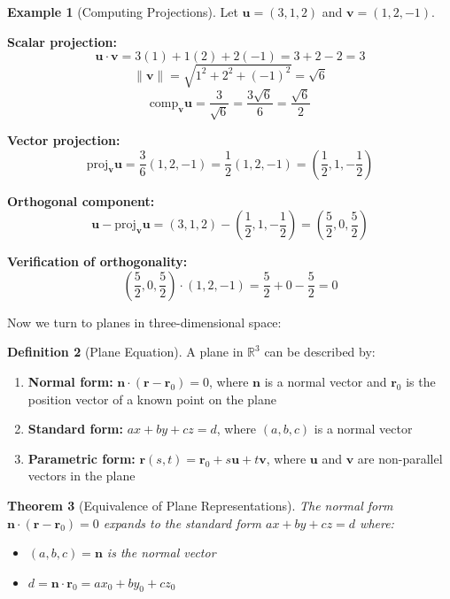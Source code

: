 \documentclass[12pt]{article}
\numberwithin{equation}{section}
\newcommand{\vect}[1]{\boldsymbol{#1}}   %
\theoremstyle{plain}
\newtheorem{theorem}{Theorem}[section]
\theoremstyle{definition}
\newtheorem{definition}[theorem]{Definition}
\newtheorem{example}[theorem]{Example}
\theoremstyle{remark}
\begin{document}
\begin{example}[Computing Projections]
Let $\vect{u} = (3, 1, 2)$ and $\vect{v} = (1, 2, -1)$.

\textbf{Scalar projection:}
$$\vect{u} \cdot \vect{v} = 3(1) + 1(2) + 2(-1) = 3 + 2 - 2 = 3$$
$$\|\vect{v}\| = \sqrt{1^2 + 2^2 + (-1)^2} = \sqrt{6}$$
$$\text{comp}_{\vect{v}}\vect{u} = \frac{3}{\sqrt{6}} = \frac{3\sqrt{6}}{6} = \frac{\sqrt{6}}{2}$$

\textbf{Vector projection:}
$$\text{proj}_{\vect{v}}\vect{u} = \frac{3}{6}(1, 2, -1) = \frac{1}{2}(1, 2, -1) = \left(\frac{1}{2}, 1, -\frac{1}{2}\right)$$

\textbf{Orthogonal component:}
$$\vect{u} - \text{proj}_{\vect{v}}\vect{u} = (3, 1, 2) - \left(\frac{1}{2}, 1, -\frac{1}{2}\right) = \left(\frac{5}{2}, 0, \frac{5}{2}\right)$$

\textbf{Verification of orthogonality:}
$$\left(\frac{5}{2}, 0, \frac{5}{2}\right) \cdot (1, 2, -1) = \frac{5}{2} + 0 - \frac{5}{2} = 0$$ \checkmark
\end{example}

Now we turn to planes in three-dimensional space:

\begin{definition}[Plane Equation]
A plane in $\mathbb{R}^3$ can be described by:
\begin{enumerate}
\item \textbf{Normal form:} $\vect{n} \cdot (\vect{r} - \vect{r}_0) = 0$, where $\vect{n}$ is a normal vector and $\vect{r}_0$ is the position vector of a known point on the plane
\item \textbf{Standard form:} $ax + by + cz = d$, where $(a, b, c)$ is a normal vector
\item \textbf{Parametric form:} $\vect{r}(s, t) = \vect{r}_0 + s\vect{u} + t\vect{v}$, where $\vect{u}$ and $\vect{v}$ are non-parallel vectors in the plane
\end{enumerate}
\end{definition}

\begin{theorem}[Equivalence of Plane Representations]
The normal form $\vect{n} \cdot (\vect{r} - \vect{r}_0) = 0$ expands to the standard form $ax + by + cz = d$ where:
\begin{itemize}
\item $(a, b, c) = \vect{n}$ is the normal vector
\item $d = \vect{n} \cdot \vect{r}_0 = ax_0 + by_0 + cz_0$
\end{itemize}
\end{theorem}
\end{document}
